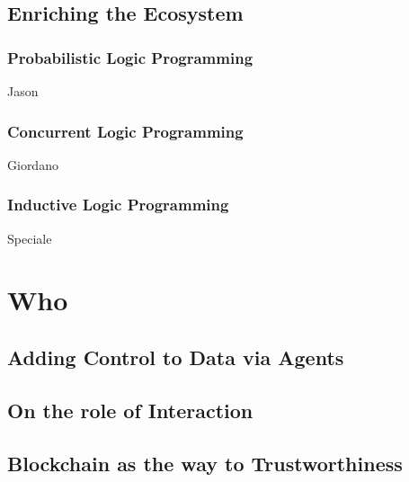 \documentclass[12pt,a4paper,openright,twoside]{book}
\begin{document}
\chapter{Enriching the Ecosystem}

\section{Probabilistic Logic Programming}

Jason

\section{Concurrent Logic Programming}

Giordano

\section{Inductive Logic Programming}

Speciale

\part{Who}
\label{part:who}

\cite{imagination-extraamas2021}
\cite{expectation-extraamas2021}

\chapter{Adding Control to Data via Agents}

\chapter{On the role of Interaction}

\cite{tusow-icccn2019}
\cite{respect-idc2017}
\cite{respectx-comsis15}

\chapter{Blockchain as the way to Trustworthiness}

\cite{bctcoord-bct4mas2018wi}
\cite{bctcoord-bct4mas2019}
\cite{bctcoordination-information11}
\cite{blockchain-goodtechs2018}
\cite{proactivesc-blockchain2019}
\cite{blockchainmas-applsci10}



\backmatter

\part*{}



\end{document}
